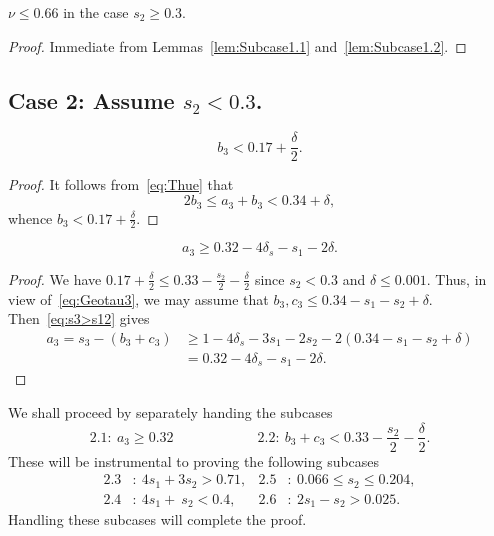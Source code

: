 \begin{lemma}\label{lem:Case1}
  \leanok
  $\nu \leq 0.66$ in the case $s_2 \geq 0.3$.
\end{lemma}
\begin{proof}
  \leanok
  Immediate from Lemmas~\ref{lem:Subcase1.1} and~\ref{lem:Subcase1.2}.
\end{proof}

\subsection*{Case 2: Assume $s_2< 0.3$.}

\begin{lemma}\label{lem:Case2Basic1}
  \leanok
  \begin{equation}\label{eq:2b3}
    b_3 < 0.17+\frac{\delta}{2}.
  \end{equation}
\end{lemma}
\begin{proof}
  \leanok
  It follows from~\eqref{eq:Thue} that
  \begin{equation}
    2b_3 \le a_3 + b_3 < 0.34+\delta,
  \end{equation}
  whence $b_3 < 0.17+\frac{\delta}{2}$.
\end{proof}

\begin{lemma}\label{lem:Case2Basic2}
  \leanok
  \begin{equation}\label{eq:Case2Basic2}
    a_3 \geq 0.32 - 4 \delta_s - s_1 - 2 \delta.
  \end{equation}
\end{lemma}

\begin{proof}
  \leanok
  We have $0.17+\frac{\delta}{2} \leq
  0.33-\frac{s_2}{2}-\frac{\delta}{2}$ since $s_2<0.3$ and $\delta\leq 0.001$. Thus, in view of~\eqref{eq:Geotau3}, we may assume that $b_3,c_3 \leq 0.34-s_1-s_2+ \delta$.
  Then~\eqref{eq:s3>s12} gives
  \begin{align*}
    a_3 = s_3 - (b_3+c_3)
    &\ge 1-4\delta_s - 3s_1 - 2s_2 - 2(0.34 - s_1 - s_2+\delta) \nonumber\\
    &= 0.32-4\delta_s -s_1-2\delta.
  \end{align*}
\end{proof}

We shall proceed by separately handing the subcases
\[
\mathbf{2.1}:\ a_3\geq 0.32 \qquad\qquad\qquad \mathbf{2.2}: \
b_3+c_3<0.33-\frac{s_2}{2}-\frac{\delta}{2}.
 \]
These will be instrumental to proving the following subcases
\begin{align*}
  \mathbf{2.3}&:\ 4s_1+3s_2 > 0.71, &
  \mathbf{2.5}&:\ 0.066\leq s_2\leq 0.204,\\
  \mathbf{2.4}&:\ 4s_1+\ s_2 <0.4 , &
  \mathbf{2.6}&:\ 2s_1-s_2>0.025.
\end{align*}
Handling these subcases will complete the proof.

